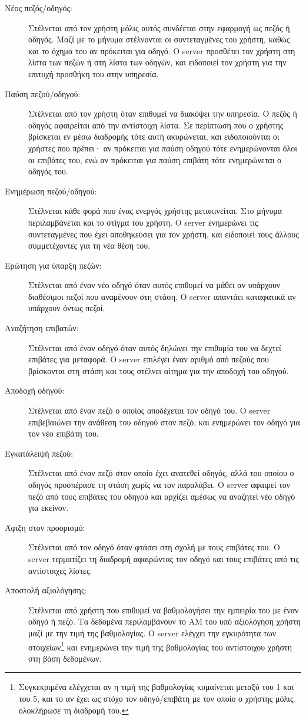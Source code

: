 \documentclass[../thesis.tex]{subfiles}
\begin{document}
\begin{description}
    \item[Νέος πεζός/οδηγός:] Στέλνεται από τον χρήστη μόλις αυτός συνδέεται στην εφαρμογή ως πεζός ή οδηγός. Μαζί με το μήνυμα στέλνονται οι συντεταγμένες του χρήστη, καθώς και το όχημα του αν πρόκειται για οδηγό. Ο server προσθέτει τον χρήστη στη λίστα των πεζών ή στη λίστα των οδηγών, και ειδοποιεί τον χρήστη για την επιτυχή προσθήκη του στην υπηρεσία.
    \item[Παύση πεζού/οδηγού:] Στέλνεται από τον χρήστη όταν επιθυμεί να διακόψει την υπηρεσία. Ο πεζός ή οδηγός αφαιρείται από την αντίστοιχη λίστα. Σε περίπτωση που ο χρήστης βρίσκεται εν μέσω διαδρομής τότε αυτή ακυρώνεται, και ειδοποιούνται οι χρήστες που πρέπει· αν πρόκειται για παύση οδηγού τότε ενημερώνονται όλοι οι επιβάτες του, ενώ αν πρόκειται για παύση επιβάτη τότε ενημερώνεται ο οδηγός του.
    \item[Ενημέρωση πεζού/οδηγού:] Στέλνεται κάθε φορά που ένας ενεργός χρήστης μετακινείται. Στο μήνυμα περιλαμβάνεται και το στίγμα του χρήστη. Ο server ενημερώνει τις συντεταγμένες που έχει αποθηκεύσει για τον χρήστη, και ειδοποιεί τους άλλους συμμετέχοντες για τη νέα θέση του.
    \item[Ερώτηση για ύπαρξη πεζών:] Στέλνεται από έναν νέο οδηγό όταν αυτός επιθυμεί να μάθει αν υπάρχουν διαθέσιμοι πεζοί που αναμένουν στη στάση. Ο server απαντάει καταφατικά αν υπάρχουν όντως πεζοί.
    \item[Αναζήτηση επιβατών:] Στέλνεται από έναν οδηγό όταν αυτός δηλώνει την επιθυμία του να δεχτεί επιβάτες για μεταφορά. Ο server επιλέγει έναν αριθμό από πεζούς που βρίσκονται στη στάση και τους στέλνει αίτημα για την αποδοχή του οδηγού.
    \item[Αποδοχή οδηγού:] Στέλνεται από έναν πεζό ο οποίος αποδέχεται τον οδηγό του. Ο server επιβεβαιώνει την ανάθεση του οδηγού στον πεζό, και ενημερώνει τον οδηγό για τον νέο επιβάτη του.
    \item[Εγκατάλειψή πεζού:] Στέλνεται από έναν πεζό στον οποίο έχει ανατεθεί οδηγός, αλλά του οποίου ο οδηγός προσπέρασε τη στάση χωρίς να τον παραλάβει. Ο server αφαιρεί τον πεζό από τους επιβάτες του οδηγού και αρχίζει αμέσως να αναζητεί νέο οδηγό για εκείνον.
    \item[Άφιξη στον προορισμό:] Στέλνεται από τον οδηγό όταν φτάσει στη σχολή με τους επιβάτες του. Ο server τερματίζει τη διαδρομή αφαιρώντας τον οδηγό και τους επιβάτες από τις αντίστοιχες λίστες.
    \item[Αποστολή αξιολόγησης:] Στέλνεται από χρήστη που επιθυμεί να βαθμολογήσει την εμπειρία του με έναν οδηγό ή πεζό. Τα δεδομένα περιλαμβάνουν το ΑΜ του υπό αξιολόγηση χρήστη μαζί με την τιμή της βαθμολογίας. Ο server ελέγχει την εγκυρότητα των στοιχείων\footnote{Συγκεκριμένα ελέγχεται αν η τιμή της βαθμολογίας κυμαίνεται μεταξύ του 1 και του 5, και το αν έχει ως στόχο τον οδηγό/επιβάτη με τον οποίο ο χρήστης μόλις ολοκλήρωσε τη διαδρομή του.} και ενημερώνει την τιμή της βαθμολογίας του αντίστοιχου χρήστη στη βάση δεδομένων.

\end{description}
\end{document}

